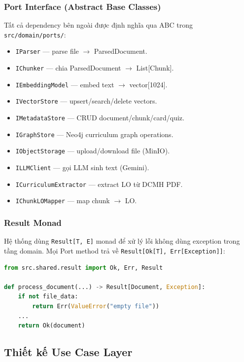 \subsubsection{Port Interface (Abstract Base Classes)}

Tất cả dependency bên ngoài được định nghĩa qua ABC trong
\texttt{src/domain/ports/}:

\begin{itemize}
    \item \texttt{IParser} --- parse file $\to$ ParsedDocument.
    \item \texttt{IChunker} --- chia ParsedDocument $\to$ List[Chunk].
    \item \texttt{IEmbeddingModel} --- embed text $\to$ vector[1024].
    \item \texttt{IVectorStore} --- upsert/search/delete vectors.
    \item \texttt{IMetadataStore} --- CRUD document/chunk/card/quiz.
    \item \texttt{IGraphStore} --- Neo4j curriculum graph operations.
    \item \texttt{IObjectStorage} --- upload/download file (MinIO).
    \item \texttt{ILLMClient} --- gọi LLM sinh text (Gemini).
    \item \texttt{ICurriculumExtractor} --- extract LO từ DCMH PDF.
    \item \texttt{IChunkLOMapper} --- map chunk $\to$ LO.
\end{itemize}

\subsubsection{Result Monad}

Hệ thống dùng \texttt{Result[T, E]} monad để xử lý lỗi không
dùng exception trong tầng domain. Mọi Port method trả về
\texttt{Result[Ok[T], Err[Exception]]}:

\begin{lstlisting}[language=Python, caption={Result monad trong domain}]
from src.shared.result import Ok, Err, Result

def process_document(...) -> Result[Document, Exception]:
    if not file_data:
        return Err(ValueError("empty file"))
    ...
    return Ok(document)
\end{lstlisting}

\subsection{Thiết kế Use Case Layer}

